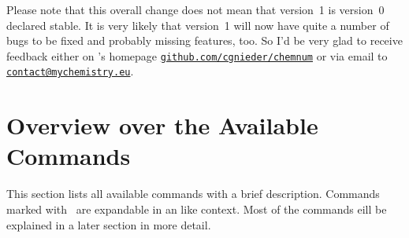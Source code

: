 \documentclass[load-preamble+,babel-options={ngerman,british,american}]{cnltx-doc}
\newcommand*\email[1]{\texttt{\href{mailto:#1}{#1}}}
\newcommand*\securewebsite[1]{\texttt{\href{https://#1/}{#1}}}
\begin{document}
Please note that this overall change does not mean that version~1 is version~0
declared stable.  It is very likely that version~1 will now have quite a
number of bugs to be fixed and probably missing features, too.  So I'd be very
glad to receive feedback either on \chemnum's homepage
\securewebsite{github.com/cgnieder/chemnum} or via email to
\email{contact@mychemistry.eu}.

\section{Overview over the Available Commands}\label{sec:overv-over-avail}

This section lists all available commands with a brief description.  Commands
marked with \expandablesign\ are expandable in an  like context.
Most of the commands eill be explained in a later section in more detail.
\end{document}
